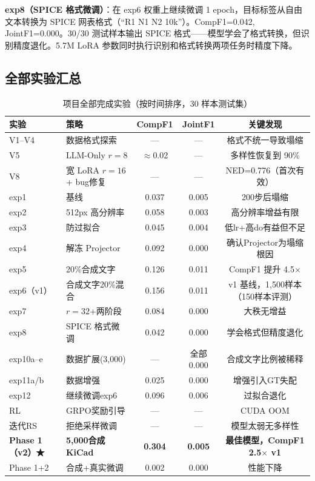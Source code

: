 \textbf{exp8（SPICE 格式微调）}：在 exp6 权重上继续微调 1 epoch，目标标签从自由文本转换为 SPICE 网表格式（``R1 N1 N2 10k''）。CompF1=0.042, JointF1=0.000。30/30 测试样本输出 SPICE 格式——模型学会了格式转换，但识别精度退化。5.7M LoRA 参数同时执行识别和格式转换两项任务时精度下降。


\subsection{全部实验汇总}

\begin{table}[h]
\centering
\caption{项目全部完成实验（按时间排序，30 样本测试集）}
\label{tab:all_exp}
\scriptsize
\begin{tabular}{llccc}
\toprule
\textbf{实验} & \textbf{策略} & \textbf{CompF1} & \textbf{JointF1} & \textbf{关键发现} \\
\midrule
V1--V4 & 数据格式探索 & — & — & 格式不统一导致塌缩 \\
V5 & LLM-Only $r=8$ & $\approx$0.02 & — & 多样性恢复到 90\% \\
V8 & 宽 LoRA $r=16$ + bug修复 & — & — & NED=0.776（首次有效）\\
exp1 & 基线 & 0.037 & 0.005 & 200步后塌缩 \\
exp2 & 512px 高分辨率 & 0.058 & 0.003 & 高分辨率增益有限 \\
exp3 & 防过拟合 & 0.045 & 0.004 & 低lr+高do有益但不足 \\
exp4 & 解冻 Projector & 0.092 & 0.000 & 确认Projector为塌缩根因 \\
exp5 & 20\%合成文字 & 0.126 & 0.011 & CompF1 提升 4.5$\times$ \\
exp6（v1）& 合成文字20\%混合 & 0.156 & 0.011 & v1 基线，1,500样本（150样本评测）\\
exp7 & $r=32$+两阶段 & 0.084 & 0.000 & 大秩无增益 \\
exp8 & SPICE 格式微调 & 0.042 & 0.000 & 学会格式但精度退化 \\
exp10a--e & 数据扩展(3,000) & — & 全部0.000 & 合成文字比例被稀释 \\
exp11a/b & 数据增强 & 0.025 & 0.000 & 增强引入GT失配 \\
exp12 & 继续微调exp6 & 0.096 & 0.006 & 过拟合退化 \\
RL & GRPO奖励引导 & — & — & CUDA OOM \\
迭代RS & 拒绝采样微调 & — & — & 模型太弱无多样性 \\
\textbf{Phase 1（v2）★} & \textbf{5,000合成KiCad} & \textbf{0.304} & \textbf{0.005} & \textbf{最佳模型，CompF1 2.5$\times$ v1} \\
Phase 1+2 & 合成+真实微调 & 0.002 & 0.000 & 性能下降 \\
\bottomrule
\end{tabular}
\end{table}


